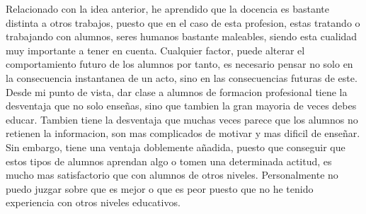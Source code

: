 \documentclass[spanish,12pt, a4paper,twoside]{paper}
\begin{document}
\justify
Relacionado con la idea anterior, he aprendido que la docencia es bastante distinta a otros trabajos, puesto que en el caso de esta profesion, estas tratando o trabajando con alumnos, seres humanos bastante maleables, siendo esta cualidad muy importante a tener en cuenta. Cualquier factor, puede alterar el comportamiento futuro de los alumnos por tanto, es necesario pensar no solo en la consecuencia instantanea de un acto, sino en las consecuencias futuras de este.
\justify
Desde mi punto de vista, dar clase a alumnos de formacion profesional tiene la desventaja que no solo enseñas, sino que tambien la gran mayoria de veces debes educar. Tambien tiene la desventaja que muchas veces parece que los alumnos no retienen la informacion, son mas complicados de motivar y mas dificil de enseñar. Sin embargo, tiene una ventaja doblemente añadida, puesto que conseguir que estos tipos de alumnos aprendan algo o tomen una determinada actitud, es mucho mas satisfactorio que con alumnos de otros niveles. Personalmente no puedo juzgar sobre que es mejor o que es peor puesto que no he tenido experiencia con otros niveles educativos.
\end{document}
